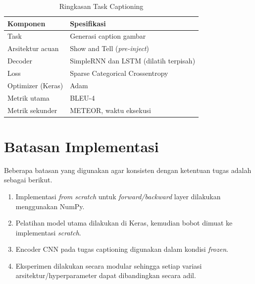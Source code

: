 \begin{table}[H]
    \centering
    \caption{Ringkasan Task Captioning}
    \begin{tabular}{ll}
        \toprule
        \textbf{Komponen} & \textbf{Spesifikasi} \\
        \midrule
        Task & Generasi caption gambar \\
        Arsitektur acuan & Show and Tell (\textit{pre-inject}) \\
        Decoder & SimpleRNN dan LSTM (dilatih terpisah) \\
        Loss & Sparse Categorical Crossentropy \\
        Optimizer (Keras) & Adam \\
        Metrik utama & BLEU-4 \\
        Metrik sekunder & METEOR, waktu eksekusi \\
        \bottomrule
    \end{tabular}
    \label{tab:ringkasan-caption}
\end{table}

\section{Batasan Implementasi}
Beberapa batasan yang digunakan agar konsisten dengan ketentuan tugas adalah sebagai berikut.

\begin{enumerate}
    \item Implementasi \textit{from scratch} untuk \textit{forward/backward} layer dilakukan menggunakan NumPy.
    \item Pelatihan model utama dilakukan di Keras, kemudian bobot dimuat ke implementasi \textit{scratch}.
    \item Encoder CNN pada tugas captioning digunakan dalam kondisi \textit{frozen}.
    \item Eksperimen dilakukan secara modular sehingga setiap variasi arsitektur/hyperparameter dapat dibandingkan secara adil.
\end{enumerate}
